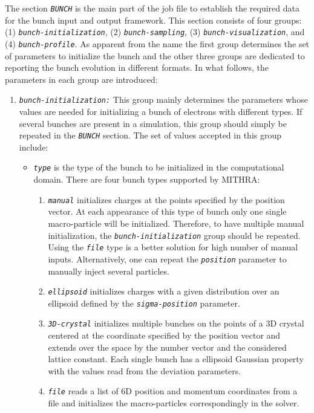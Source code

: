The section {\tt \small \em BUNCH} is the main part of the job file to establish the required data for the bunch input and output framework.
%
This section consists of four groups: (1) {\tt \em \small bunch-initialization}, (2) {\tt \em \small bunch-sampling}, (3) {\tt \em \small bunch-visualization}, and (4) {\tt \em \small bunch-profile}.
%
As apparent from the name the first group determines the set of parameters to initialize the bunch and the other three groups are dedicated to reporting the bunch evolution in different formats.
%
In what follows, the parameters in each group are introduced:

\begin{enumerate}
\item {\tt \small \em bunch-initialization:} This group mainly determines the parameters whose values are needed for initializing a bunch of electrons with different types. If several bunches are present in a simulation, this group should simply be repeated in the {\tt \small \em BUNCH} section. The set of values accepted in this group include:
%
\begin{itemize}
\item {\tt \small \em type} is the type of the bunch to be initialized in the computational domain. There are four bunch types supported by MITHRA:
\begin{enumerate}
	\item {\tt \small \em manual} initializes charges at the points specified by the position vector. At each appearance of this type of bunch only one single macro-particle will be initialized. Therefore, to have multiple manual initialization, the {\tt \small \em bunch-initialization} group should be repeated. Using the {\tt \small \em file} type is a better solution for high number of manual inputs. Alternatively, one can repeat the {\tt \small \em position} parameter to manually inject several particles.
	\item {\tt \small \em ellipsoid} initializes charges with a given distribution over an ellipsoid defined by the {\tt \small \em sigma-position} parameter.
	\item {\tt \small \em 3D-crystal} initializes multiple bunches on the points of a 3D crystal centered at the coordinate specified by the position vector and extends over the space by the number vector and the considered lattice constant. Each single bunch has a ellipsoid Gaussian property with the values read from the deviation parameters.
	\item {\tt \small \em file} reads a list of 6D position and momentum coordinates from a file and initializes the macro-particles correspondingly in the solver.

\end{enumerate}
\end{itemize}
\end{enumerate}
